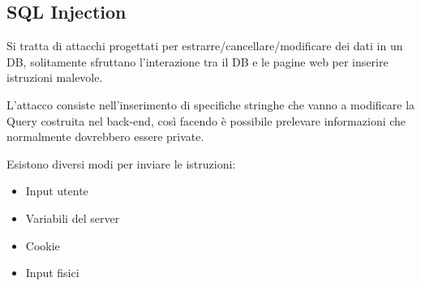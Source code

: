 \documentclass{article}
\begin{document}
\subsection{SQL Injection}

Si tratta di attacchi progettati per estrarre/cancellare/modificare dei dati in un DB, solitamente sfruttano l'interazione tra il DB e le pagine web per inserire istruzioni malevole.\newline

\noindent L'attacco consiste nell'inserimento di specifiche stringhe che vanno a modificare la Query costruita nel back-end, così facendo è possibile prelevare informazioni che normalmente dovrebbero essere private.\newline

\noindent Esistono diversi modi per inviare le istruzioni:
\begin{itemize}
    \item Input utente
    \item Variabili del server
    \item Cookie
    \item Input fisici\newline
\end{itemize}
\end{document}
